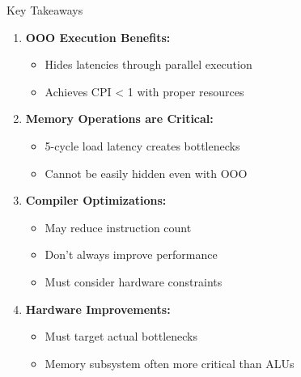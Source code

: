 \documentclass[aspectratio=169,12pt]{beamer}
\begin{document}
\begin{frame}{Key Takeaways}
\begin{enumerate}
    \item \textbf{OOO Execution Benefits:}
    \begin{itemize}
        \item Hides latencies through parallel execution
        \item Achieves CPI < 1 with proper resources
    \end{itemize}
    
    \item \textbf{Memory Operations are Critical:}
    \begin{itemize}
        \item 5-cycle load latency creates bottlenecks
        \item Cannot be easily hidden even with OOO
    \end{itemize}
    
    \item \textbf{Compiler Optimizations:}
    \begin{itemize}
        \item May reduce instruction count
        \item Don't always improve performance
        \item Must consider hardware constraints
    \end{itemize}
    
    \item \textbf{Hardware Improvements:}
    \begin{itemize}
        \item Must target actual bottlenecks
        \item Memory subsystem often more critical than ALUs
    \end{itemize}
\end{enumerate}
\end{frame}
\end{document}
